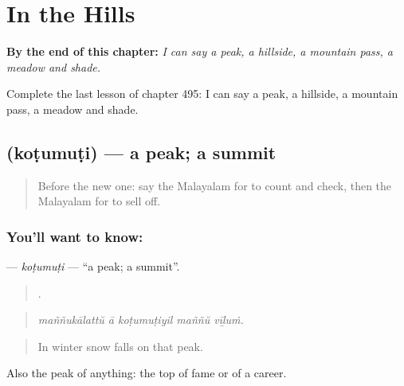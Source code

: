 
\chapter{In the Hills}
\label{ch:ml-in-the-hills}

\begin{chapteropening}
\textbf{By the end of this chapter:} \emph{I can say a peak, a hillside, a mountain pass, a meadow and shade.}

Complete the last lesson of chapter 495: I can say a peak, a hillside, a mountain pass, a meadow and shade.
\end{chapteropening}

\section[\texorpdfstring{\ml{കൊടുമുടി} (koṭumuṭi)}{കൊടുമുടി (koṭumuṭi)}]{ (koṭumuṭi) — a peak; a summit}

\label{lesson:ML-C495-kotumuti}



\begin{quote}
Before the new one: say the Malayalam for to count and check, then the Malayalam for to sell off.
\end{quote}

\subsection*{You'll want to know: }
\textbf{} — \emph{koṭumuṭi} — \textquotedblleft{}a peak; a summit\textquotedblright{}.

\begin{quote}
    .
\end{quote}

\begin{quote}
\emph{maññukālattŭ ā koṭumuṭiyil maññŭ vīḻuṁ.}
\end{quote}

\begin{quote}
In winter snow falls on that peak.
\end{quote}

Also the peak of anything: the top of fame or of a career.

